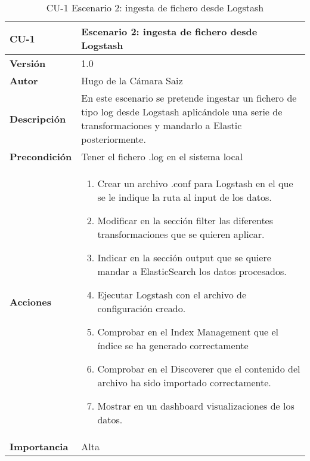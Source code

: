 \begin{table}[p]
	\centering
	\begin{tabularx}{\linewidth}{ p{} p{} }
		\toprule
		\textbf{CU-1}    & \textbf{Escenario 2: ingesta de fichero desde Logstash}\\
		\toprule
		\textbf{Versión}              & 1.0    \\
		\textbf{Autor}                & Hugo de la Cámara Saiz \\
		\textbf{Descripción}          & En este escenario se pretende ingestar un fichero de tipo log desde Logstash aplicándole una serie de transformaciones y mandarlo a Elastic posteriormente. \\
		\textbf{Precondición}         & Tener el fichero .log en el sistema local \\
		\textbf{Acciones}             &
		\begin{enumerate}
			\def\labelenumi{\arabic{enumi}.}
			\tightlist
			\item Crear un archivo .conf para Logstash en el que se le indique la ruta al input de los datos.
                \item Modificar en la sección filter las diferentes transformaciones que se quieren aplicar.
                \item Indicar en la sección output que se quiere mandar a ElasticSearch los datos procesados.
                \item Ejecutar Logstash con el archivo de configuración creado.
                \item Comprobar en el Index Management que el índice se ha generado correctamente
			\item Comprobar en el Discoverer que el contenido del archivo ha sido importado correctamente.
                \item Mostrar en un dashboard visualizaciones de los datos.
		\end{enumerate}\\
		\textbf{Importancia}          & Alta \\
		\bottomrule
	\end{tabularx}
	\caption{CU-1 Escenario 2: ingesta de fichero desde Logstash}
\end{table}

